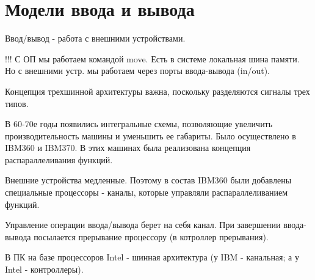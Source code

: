 \documentclass[14pt, a4paper]{article}
\begin{document}
	\section{Модели ввода и вывода}
	
	Ввод/вывод - работа с внешними устройствами.

	!!! С ОП мы работаем командой move. Есть в системе локальная шина памяти. Но с внешними устр. мы работаем через порты ввода-вывода (in/out).
	
	Концепция трехшинной архитектуры важна, поскольку разделяются сигналы трех типов.
	
	В 60-70е годы появились интегральные схемы, позволяющие увеличить производительность машины и уменьшить ее габариты. Было осуществлено в IBM360 и IBM370. В этих машинах была реализована концепция распараллеливания функций.
	
	Внешние устройства медленные. Поэтому в состав IBM360 были добавлены специальные процессоры - каналы, которые управляли распараллеливанием функций.
	
	Управление операции ввода/вывода берет на себя канал. При завершении ввода-вывода посылается прерывание процессору (в котроллер прерывания).
	
	В ПК на базе процессоров Intel - шинная архитектура (у IBM - канальная; а у Intel - контроллеры).
	
\end{document}
